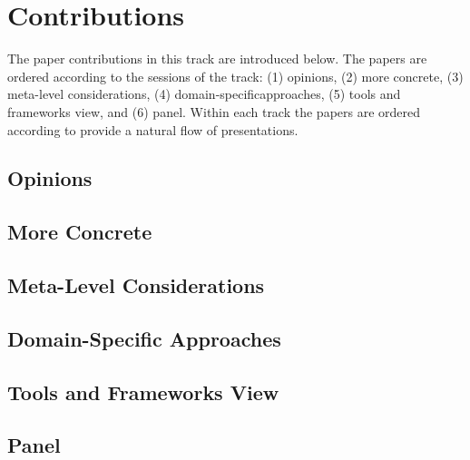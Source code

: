

\section{Contributions}
\label{sec:contributions}

The paper contributions in this track are introduced below. The papers are ordered according to the sessions of the track: 
(1) opinions, 
(2) more concrete,
(3) meta-level considerations​,
(4) domain-specific ​approaches​,
(5) ​tools and frameworks view​, and 
(6) panel​​.
%
Within each track the papers are ordered according to provide
a natural flow of presentations. 

\subsection{Opinions}





\subsection{More Concrete}





\subsection{Meta-Level Considerations}





\subsection{Domain-Specific ​Approaches}





\subsection{Tools and Frameworks View​}





\subsection{Panel}



